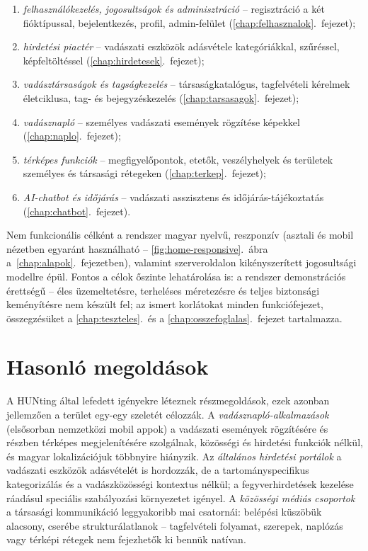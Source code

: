 \begin{enumerate}[nosep]
	\item \emph{felhasználókezelés, jogosultságok és adminisztráció} -- regisztráció a két
	      fióktípussal, bejelentkezés, profil, admin-felület (\ref{chap:felhasznalok}.~fejezet);
	\item \emph{hirdetési piactér} -- vadászati eszközök adásvétele kategóriákkal, szűréssel,
	      képfeltöltéssel (\ref{chap:hirdetesek}.~fejezet);
	\item \emph{vadásztársaságok és tagságkezelés} -- társaságkatalógus, tagfelvételi
	      kérelmek életciklusa, tag- és bejegyzéskezelés (\ref{chap:tarsasagok}.~fejezet);
	\item \emph{vadásznapló} -- személyes vadászati események rögzítése képekkel
	      (\ref{chap:naplo}.~fejezet);
	\item \emph{térképes funkciók} -- megfigyelőpontok, etetők, veszélyhelyek és területek
	      személyes és társasági rétegeken (\ref{chap:terkep}.~fejezet);
	\item \emph{AI-chatbot és időjárás} -- vadászati asszisztens és időjárás-tájékoztatás
	      (\ref{chap:chatbot}.~fejezet).
\end{enumerate}

Nem funkcionális célként a rendszer magyar nyelvű, reszponzív (asztali és mobil nézetben
egyaránt használható -- \ref{fig:home-responsive}.~ábra a~\ref{chap:alapok}.~fejezetben),
valamint szerveroldalon kikényszerített jogosultsági modellre épül. Fontos a célok őszinte
lehatárolása is: a rendszer demonstrációs érettségű -- éles üzemeltetésre, terheléses
méretezésre és teljes biztonsági keményítésre nem készült fel; az ismert korlátokat minden
funkciófejezet, összegzésüket a \ref{chap:teszteles}.~és a \ref{chap:osszefoglalas}.~fejezet
tartalmazza.

\section{Hasonló megoldások}
\label{sec:bev-hasonlo}


A HUNting által lefedett igényekre léteznek részmegoldások, ezek azonban jellemzően a terület
egy-egy szeletét célozzák. A \emph{vadásznapló-alkalmazások} (elsősorban nemzetközi mobil
appok) a vadászati események rögzítésére és részben térképes megjelenítésére szolgálnak,
közösségi és hirdetési funkciók nélkül, és magyar lokalizációjuk többnyire hiányzik. Az
\emph{általános hirdetési portálok} a vadászati eszközök adásvételét is hordozzák, de a
tartományspecifikus kategorizálás és a vadászközösségi kontextus nélkül; a fegyverhirdetések
kezelése ráadásul speciális szabályozási környezetet igényel. A \emph{közösségi médiás
csoportok} a társasági kommunikáció leggyakoribb mai csatornái: belépési küszöbük alacsony,
cserébe strukturálatlanok -- tagfelvételi folyamat, szerepek, naplózás vagy térképi rétegek
nem fejezhetők ki bennük natívan.

